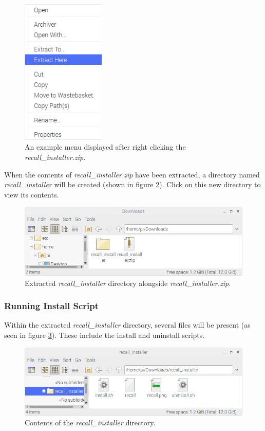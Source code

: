 \documentclass[letterpaper]{article}
\begin{document}
\begin{figure}[H]
  \centering
  \includegraphics[width=4cm]{images/graphical_install/extraction_menu.png}
  \caption{An example menu displayed after right clicking the \textit{recall\_installer.zip}.}
  \label{fig:graphical_extraction_menu}
\end{figure}

When the contents of \textit{recall\_installer.zip} have been extracted, a directory named \textit{recall\_installer} will be created (shown in figure \ref{fig:graphical_folder_with_zip}). Click on this new directory to view its contents.

\begin{figure}[H]
  \centering
  \includegraphics[width=14cm]{images/graphical_install/folder_and_zip.png}
  \caption{Extracted \textit{recall\_installer} directory alongside \textit{recall\_installer.zip}.}
  \label{fig:graphical_folder_with_zip}
\end{figure}

\subsubsection{Running Install Script}
Within the extracted \textit{recall\_installer} directory, several files will be present (as seen in figure \ref{fig:within_graphical_installer_folder}). These include the install and uninstall scripts.

\begin{figure}[H]
  \centering
  \includegraphics[width=14cm]{images/graphical_install/inside_install_folder.png}
  \caption{Contents of the \textit{recall\_installer} directory.}
  \label{fig:within_graphical_installer_folder}
\end{figure}
\end{document}
